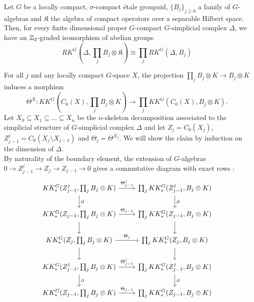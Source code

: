 
\begin{lem}\label{prod}
Let $G$ be a locally compact, $\sigma$-compact étale groupoid, $\{B_j\}_{j\geq  0}$ a family of $G$-algebras and $\mathfrak K$ the algebra of compact operators over a separable Hilbert space. Then, for every finite dimensional proper $G$-compact $G$-simplicial complex $\Delta$, we have an $\mathbb Z_2$-graded isomorphism of abelian groups
\[RK^G(\Delta,\prod_j B_j\otimes \mathfrak K)\cong \prod_j RK^G(\Delta,B_j)\]
\end{lem}

\begin{dem}
For all $j$ and any locally compact $G$-space $X$, the projection $\prod_j B_j\otimes K\rightarrow B_j \otimes K$ induces a morphism
\[\Theta^X : KK^G(C_0(X),\prod_j B_j\otimes K )\rightarrow \prod_j  KK^G(C_0(X),B_j\otimes K ).\]
Let $X_0\subseteq X_1 \subseteq...\subseteq X_n$ be the $n$-skeleton decomposition associated to the simplicial structure of $G$-simplicial complex $\Delta$ and let $Z_j = C_0(X_j)$, $Z^j_{j-1} = C_0(X_j \setminus X_{j-1})$ and $\Theta_j = \Theta^{X_j}$.
We will show the claim by induction on the dimension of $\Delta$.\\

By naturality of the boundary element, the extension of $G$-algebras $0\rightarrow Z^j_{j-1} \rightarrow Z_j \rightarrow Z_{j-1}\rightarrow 0$ gives a commutative diagram with exact rows :
\[\begin{tikzcd}
KK^G_*(Z^j_{j-1},\prod_j B_j\otimes K)\arrow{d}{\partial}\arrow{r}{\Theta^j_{j-1}} & \prod_j KK^G_*( Z^j_{j-1},B_j \otimes K)\arrow{d}{\partial}  \\
KK^G_*(Z_{j-1},\prod_j B_j\otimes K)\arrow{d}\arrow{r}{\Theta_{j-1}}  & \prod_j KK^G_*( Z_{j-1},B_j \otimes K)\arrow{d} \\
KK^G_*(Z_j,\prod_j B_j\otimes K)\arrow{d}\arrow{r}{\Theta_j} & \prod_j KK^G_*( Z_j,B_j \otimes K)\arrow{d} \\
KK^G_*(Z^j_{j-1},\prod_j B_j\otimes K)\arrow{d}{\partial}\arrow{r}{\Theta^j_{j-1}} & \prod_j KK^G_*( Z^j_{j-1},B_j \otimes K)\arrow{d}{\partial}\\
KK^G_*(Z_{j-1},\prod_j B_j\otimes K)\arrow{r}{\Theta_{j-1}} & \prod_j KK^G_*( Z_{j-1},B_j \otimes K)
\end{tikzcd}\]


\end{dem}
